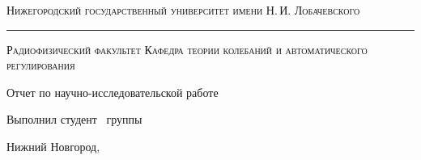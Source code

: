 \begin{titlepage}
	
	\begin{center}
		
		{\small\textsc{Нижегородский государственный университет имени Н.\,И. Лобачевского}}
		\vskip 1pt \hrule \vskip 3pt
		{\small\textsc{Радиофизический факультет}}
		{\small\textsc{Кафедра теории колебаний и автоматического регулирования}}
		
		
		
		\vfill
		
		{\Large Отчет по научно-исследовательской работе \vskip 12pt\bfseries \labtheme}
		
	\end{center}
	
	\vfill
	
	\begin{flushright}
		{Выполнил студент \labgroup\ группы\\ \labauthor}
	\end{flushright}
	
	\vfill
	
	\begin{center}
		Нижний Новгород, \the\year
	\end{center}
	
\end{titlepage}

